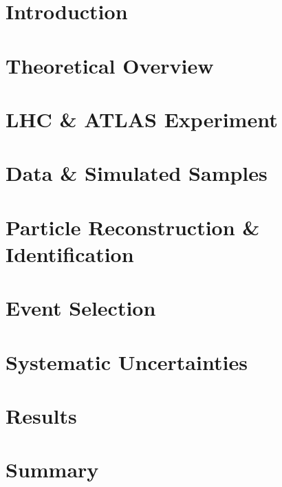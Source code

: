 \documentclass{msuphddissertation}
\begin{document}
\begin{doublespace}
{\chapter{Introduction}
\label{chap:intro}


\chapter{Theoretical Overview}
\label{chap:theory}


\chapter{LHC \& ATLAS Experiment}
\label{chap:LHCATLAS}


\chapter{Data \& Simulated Samples}
\label{chap:samples}


\chapter{Particle Reconstruction \& Identification}
\label{chap:obj}


\chapter{Event Selection}
\label{chap:evntsel}


%

\chapter{Systematic Uncertainties}
\label{chap:sys}


\chapter{Results}
\label{chap:results}


\chapter{Summary}
\label{chap:summary}


}
\end{doublespace}
\end{document}
